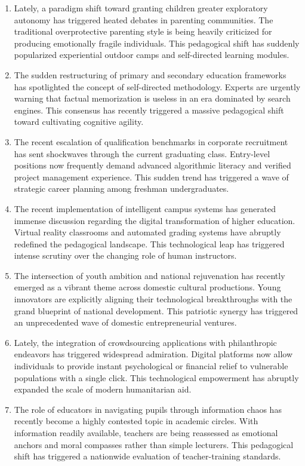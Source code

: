 ﻿\documentclass[lang=cn,11pt]{elegantbook}
\begin{document}
\begin{enumerate}
\item Lately, a paradigm shift toward granting children greater exploratory autonomy has triggered heated debates in parenting communities. The traditional overprotective parenting style is being heavily criticized for producing emotionally fragile individuals. This pedagogical shift has suddenly popularized experiential outdoor camps and self-directed learning modules.
\item The sudden restructuring of primary and secondary education frameworks has spotlighted the concept of self-directed methodology. Experts are urgently warning that factual memorization is useless in an era dominated by search engines. This consensus has recently triggered a massive pedagogical shift toward cultivating cognitive agility.
\item The recent escalation of qualification benchmarks in corporate recruitment has sent shockwaves through the current graduating class. Entry-level positions now frequently demand advanced algorithmic literacy and verified project management experience. This sudden trend has triggered a wave of strategic career planning among freshman undergraduates.
\item The recent implementation of intelligent campus systems has generated immense discussion regarding the digital transformation of higher education. Virtual reality classrooms and automated grading systems have abruptly redefined the pedagogical landscape. This technological leap has triggered intense scrutiny over the changing role of human instructors.
\item The intersection of youth ambition and national rejuvenation has recently emerged as a vibrant theme across domestic cultural productions. Young innovators are explicitly aligning their technological breakthroughs with the grand blueprint of national development. This patriotic synergy has triggered an unprecedented wave of domestic entrepreneurial ventures.
\item Lately, the integration of crowdsourcing applications with philanthropic endeavors has triggered widespread admiration. Digital platforms now allow individuals to provide instant psychological or financial relief to vulnerable populations with a single click. This technological empowerment has abruptly expanded the scale of modern humanitarian aid.
\item The role of educators in navigating pupils through information chaos has recently become a highly contested topic in academic circles. With information readily available, teachers are being reassessed as emotional anchors and moral compasses rather than simple lecturers. This pedagogical shift has triggered a nationwide evaluation of teacher-training standards. 
\end{enumerate}
\end{document}
